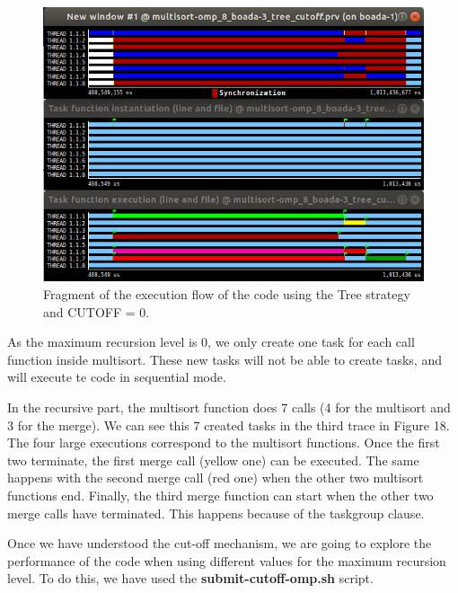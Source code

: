 \documentclass[12pt, a4paper]{article}
\begin{document}
\begin{figure}[H]
	\centering
	\includegraphics[scale=0.45]{./images/S2/Tree_CUTOFF_paraver}
	
	\label{fig:trace_cutoff_tree}
	\caption{Fragment of the execution flow of the code using the Tree strategy and CUTOFF = 0.}
\end{figure}

As the maximum recursion level is 0, we only create one task for each call function inside multisort. These new tasks will not be able to create tasks, and will execute te code in sequential mode.

In the recursive part, the multisort function does 7 calls (4 for the multisort and 3 for the merge). We can see this 7 created tasks in the third trace in Figure 18. The four large executions correspond to the multisort functions. Once the first two terminate, the first merge call (yellow one) can be executed. The same happens with the second merge call (red one) when the other two multisort functions end. Finally, the third merge function can start when the other two merge calls have terminated. This happens because of the taskgroup clause.

Once we have understood the cut-off mechanism, we are going to explore the performance of the code when using different values for the maximum recursion level. To do this, we have used the \textbf{submit-cutoff-omp.sh} script.
\end{document}
